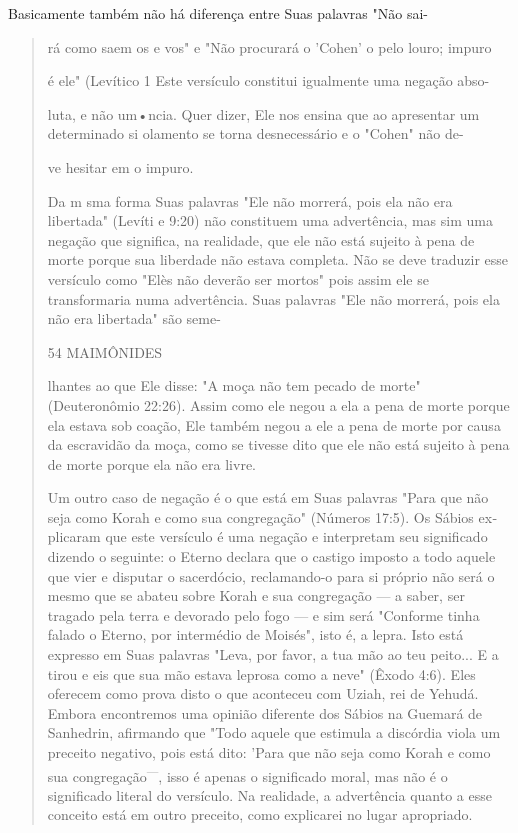 Basicamente também não há diferença entre Suas palavras "Não sai-

\begin{quote}
rá como saem os e vos" e "Não procurará o 'Cohen' o pelo louro; impuro

é ele" (Levítico 1 Este versículo constitui igualmente uma negação abso-

luta, e não um•ncia. Quer dizer, Ele nos ensina que ao apresentar um\\
determinado si olamento se torna desnecessário e o "Cohen" não de-

ve hesitar em o impuro.

Da m sma forma Suas palavras "Ele não morrerá, pois ela não era
libertada" (Levíti e 9:20) não constituem uma advertência, mas sim uma
ne­gação que significa, na realidade, que ele não está sujeito à pena de
morte por­que sua liberdade não estava completa. Não se deve traduzir
esse versículo co­mo "Elès não deverão ser mortos" pois assim ele se
transformaria numa adver­tência. Suas palavras "Ele não morrerá, pois
ela não era libertada" são seme-

54 MAIMÔNIDES

lhantes ao que Ele disse: "A moça não tem pecado de morte" (Deuteronômio
22:26). Assim como ele negou a ela a pena de morte porque ela estava sob
coa­ção, Ele também negou a ele a pena de morte por causa da escravidão
da moça, como se tivesse dito que ele não está sujeito à pena de morte
porque ela não era livre.

Um outro caso de negação é o que está em Suas palavras "Para que não
seja como Korah e como sua congregação" (Números 17:5). Os Sábios
ex­plicaram que este versículo é uma negação e interpretam seu
significado dizen­do o seguinte: o Eterno declara que o castigo imposto
a todo aquele que vier e disputar o sacerdócio, reclamando-o para si
próprio não será o mesmo que se abateu sobre Korah e sua congregação ---
a saber, ser tragado pela terra e devorado pelo fogo --- e sim será
"Conforme tinha falado o Eterno, por inter­médio de Moisés", isto é, a
lepra. Isto está expresso em Suas palavras "Leva, por favor, a tua mão
ao teu peito... E a tirou e eis que sua mão estava leprosa como a neve"
(Êxodo 4:6). Eles oferecem como prova disto o que aconteceu com Uziah,
rei de Yehudá. Embora encontremos uma opinião diferente dos Sá­bios na
Guemará de Sanhedrin, afirmando que "Todo aquele que estimula a
discórdia viola um preceito negativo, pois está dito: 'Para que não seja
como Korah e como sua congregação\textsuperscript{---}, isso é apenas o
significado moral, mas não é o significado literal do versículo. Na
realidade, a advertência quanto a esse conceito está em outro preceito,
como explicarei no lugar apropriado.


\end{quote}
